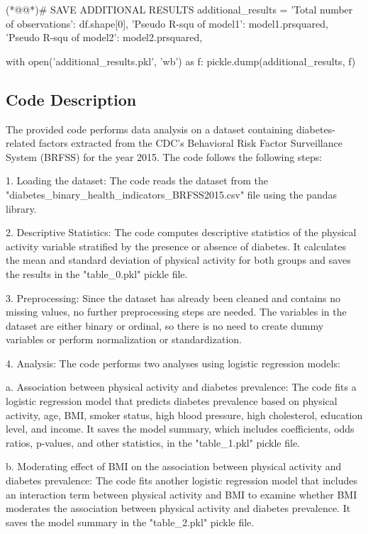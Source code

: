 \documentclass[11pt]{article}
\begin{document}
\begin{python}
(*@@*)# SAVE ADDITIONAL RESULTS
additional_results = {
 'Total number of observations': df.shape[0], 
 'Pseudo R-squ of model1': model1.prsquared,
 'Pseudo R-squ of model2': model2.prsquared,
}

with open('additional_results.pkl', 'wb') as f:
 pickle.dump(additional_results, f)

\end{python}

\subsection{Code Description}

The provided code performs data analysis on a dataset containing diabetes-related factors extracted from the CDC's Behavioral Risk Factor Surveillance System (BRFSS) for the year 2015. The code follows the following steps:

1. Loading the dataset: 
   The code reads the dataset from the "diabetes\_binary\_health\_indicators\_BRFSS2015.csv" file using the pandas library.

2. Descriptive Statistics:
   The code computes descriptive statistics of the physical activity variable stratified by the presence or absence of diabetes. It calculates the mean and standard deviation of physical activity for both groups and saves the results in the "table\_0.pkl" pickle file.

3. Preprocessing:
   Since the dataset has already been cleaned and contains no missing values, no further preprocessing steps are needed. The variables in the dataset are either binary or ordinal, so there is no need to create dummy variables or perform normalization or standardization.

4. Analysis:
   The code performs two analyses using logistic regression models:

   a. Association between physical activity and diabetes prevalence:
      The code fits a logistic regression model that predicts diabetes prevalence based on physical activity, age, BMI, smoker status, high blood pressure, high cholesterol, education level, and income. It saves the model summary, which includes coefficients, odds ratios, p-values, and other statistics, in the "table\_1.pkl" pickle file.

   b. Moderating effect of BMI on the association between physical activity and diabetes prevalence:
      The code fits another logistic regression model that includes an interaction term between physical activity and BMI to examine whether BMI moderates the association between physical activity and diabetes prevalence. It saves the model summary in the "table\_2.pkl" pickle file.
\end{document}
